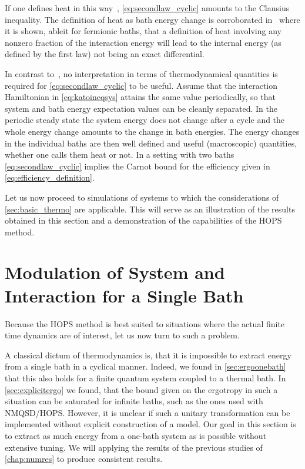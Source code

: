 If one defines heat in this
way~\cite{Kato2016Dec,Riechers2021Apr,Strasberg2021Aug},
\cref{eq:secondlaw_cyclic} amounts to the Clausius inequality. The
definition of heat as bath energy change is corroborated
in~\cite{Esposito2015Dec} where it is shown, ableit for fermionic
baths, that a definition of heat involving any nonzero fraction of the
interaction energy will lead to the internal energy (as defined by the
first law) not being an exact differential.

In contrast to~\cite{Strasberg2021Aug}, no interpretation in terms of
thermodynamical quantities is required for \cref{eq:secondlaw_cyclic}
to be useful.  Assume that the interaction Hamiltonian in
\cref{eq:katoineqsys} attains the same value periodically, so that
system and bath energy expectation values can be cleanly separated. In
the periodic steady state the system energy does not change after a
cycle and the whole energy change amounts to the change in bath
energies. The energy changes in the individual baths are then well
defined and useful (macroscopic) quantities, whether one calls them
heat or not.  In a setting with two baths \cref{eq:secondlaw_cyclic}
implies the Carnot bound for the efficiency given in
\cref{eq:efficiency_definition}.

Let us now proceed to simulations of systems to which the
considerations of \cref{sec:basic_thermo} are applicable. This will
serve as an illustration of the results obtained in this section and a
demonstration of the capabilities of the HOPS method.

\section{Modulation of System and Interaction for a Single Bath}%
\label{sec:singlemod}
Because the HOPS method is best suited to situations where the actual
finite time dynamics are of interest, let us now turn to such a
problem.

A classical dictum of thermodynamics is, that it is impossible to
extract energy from a single bath in a cyclical manner. Indeed, we
found in \cref{sec:ergoonebath} that this also holds for a finite
quantum system coupled to a thermal bath. In \cref{sec:explicitergo}
we found, that the bound given on the ergotropy in such a situation
can be saturated for infinite baths, such as the ones used with
NMQSD/HOPS. However, it is unclear if such a unitary transformation
can be implemented without explicit construction of a model. Our goal
in this section is to extract as much energy from a one-bath system as
is possible without extensive tuning. We will applying the results of
the previous studies of \cref{chap:numres} to produce consistent
results.

